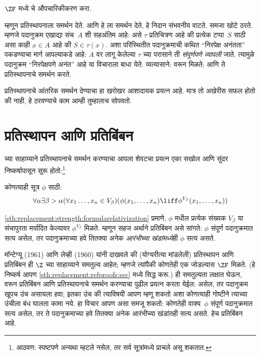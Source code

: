 \begin{prob}
  $\ZF$ मध्ये \stagescofin{} चे औपचारिकीकरण करा.
\end{prob}

म्हणून \stagescofin{} प्रतिस्थापनाला समर्थन देते. आणि \stagesinex{} हे \stagescofin{} ला समर्थन देते, हे निदान संभवनीय वाटते. समजा \stagescofin{} खोटे ठरते. म्हणजे पदानुक्रम एखाद्या संच~$A$ शी सहअंतिम आहे: असे $\tau$ प्रतिचित्रण आहे की प्रत्येक टप्पा~$S$ साठी असा काही $x \in A$ आहे की $S \in \tau(x)$. अशा परिस्थितीत पदानुक्रमाची कथित ``निरपेक्ष अनंतता'' पकडण्याचा मार्ग आपल्याकडे आहे: $A$ वर लागू केलेल्या $\tau$ च्या परासाने ती \emph{संपूर्णपणे व्यापली} जाते. त्यामुळे पदानुक्रम ``निरपेक्षपणे अनंत'' आहे या विचाराला बाधा येते. व्यत्यासाने: \stagesinex{} वरून \stagescofin{} मिळते; आणि ते प्रतिस्थापनाचे समर्थन करते.

प्रतिस्थापनाचे आंतरिक समर्थन देण्याचा हा खरोखर आशादायक प्रयत्न आहे. मात्र तो अखेरीस सफल होतो की नाही, हे ठरवण्याचे काम आम्ही तुम्हालाच सोपवतो.







\section{प्रतिस्थापन आणि प्रतिबिंबन}\label{sth:replacement:ref:sec}

\stagesinex{} च्या साहाय्याने प्रतिस्थापनाचे समर्थन करण्याचा आपला शेवटचा प्रयत्न एका सखोल आणि सुंदर निष्कर्षापासून सुरू होतो:\footnote{आठवण: स्पष्टपणे अन्यथा म्हटले नसेल, तर सर्व सूत्रांमध्ये प्राचले असू शकतात.}


\begin{thm}[प्रतिबिंबन रूपबंध]\label{sth:replacement:ref:reflectionschema}
कोणत्याही सूत्र $\phi$ साठी:
\[
\forall \alpha \exists \beta > \alpha (\forall x_1 \ldots, x_n \in
V_\beta)(\phi(x_1, \ldots, x_n) \liff \phi^{V_\beta}(x_1, \ldots, x_n))
\]
\end{thm}
\noindent
\ref{sth:replacement:strength:formularelativization} प्रमाणे, $\phi$ मधील प्रत्येक संख्यक $V_\beta$ या संचापुरता मर्यादित केल्यावर $\phi^{V_\beta}$ मिळते. म्हणून सहज अर्थाने प्रतिबिंबन असे सांगते: $\phi$ संपूर्ण पदानुक्रमात सत्य असेल, तर पदानुक्रमाच्या हवे तितक्या अनेक \emph{आरंभीच्या खंडांमध्ये}ही $\phi$ सत्य असते.

मॉन्टेग्यू (1961) आणि लेव्ही (1960) यांनी दाखवले की (योग्यरीत्या मांडलेली) प्रतिस्थापन आणि प्रतिबिंबन ही $\Z$ च्या साहाय्याने समतुल्य आहेत; म्हणजे त्यांपैकी कोणतेही एक जोडल्यास $\ZF$ मिळते. (हे निष्कर्ष आपण \ref{sth:replacement:refproofs:sec} मध्ये सिद्ध करू.) ही समतुल्यता लक्षात घेऊन, \stagesinex{} वरून प्रतिबिंबन आणि प्रतिस्थापनाचे समर्थन करण्याचा पुढील प्रयत्न करता येईल: \stagesinex{} असेल, तर पदानुक्रम खूपच उंच असायला हवा; इतका उंच की त्याविषयी आपण म्हणू शकतो अशा कोणत्याही गोष्टीने त्याच्या उंचीला बंध घालता कामा नये. हा विचार आपण असा समजू शकतो: कोणतेही वाक्य~$\phi$ संपूर्ण पदानुक्रमात सत्य असेल, तर ते पदानुक्रमाच्या हवे तितक्या अनेक आरंभीच्या खंडांतही सत्य असते. हेच प्रतिबिंबन आहे.

